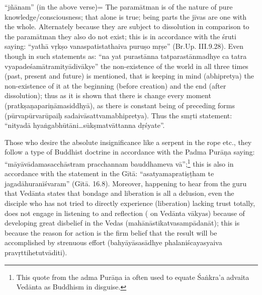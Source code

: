 “jñānam” (in the above verse)= The paramātman is of the nature of pure knowledge/consciousness; that alone is true; being parts the jīvas are one with the whole. Alternately because they are subject to dissolution in comparison to the paramātman they also do not exist; this is in accordance with the śruti saying: “yathā vṛkṣo vanaspatistathaiva puruṣo mṛṣe” (Br.Up. III.9.28). Even though in such statements as: “na yat purastānna tatparastānmadhye ca tatra vyapadeśamātramityādivākye” the non-existence of the world in all three times (past, present and future) is mentioned, that is keeping in mind (abhipretya) the non-existence of it at the beginning (before creation) and the end (after dissolution); thus as it is shown that there is change every moment (pratkṣaṇapariṇāmasiddhyā),  as there is constant being of  preceding forms (pūrvapūrvarūpaiḥ sadaivāsattvamabhipretya). Thus the smṛti statement: “nityadā hyaṅgabhūtāni…sūkṣmatvāttanna dṛśyate”.

Those who desire the absolute insignificance like a serpent in the rope etc., they follow a type of Buddhist doctrine in accordance with the Padma Purāṇa saying: “māyāvādamasacchāstram pracchannam bauddhameva vā”;\footnote{This quote from the adma Purāṇa ia often used to equate Śaṅkra’a advaita Vedānta as Buddhism in disguise.} this is also in accordance with the statement in the Gītā: “asatyamapratiṣṭham te jagadāhuranīśvaram” (Gītā. 16.8). Moreover, happening to hear from the guru that Vedānta states that bondage and liberation is all a delusion, even the disciple who has not tried to directly experience (liberation) lacking trust totally, does not  engage in listening to and reflection ( on Vedānta vākyas) because of developing great disbelief in the Vedas (mahānāstikatvasampādanāt); this is because the reason for action is the firm belief that the result will be accomplished by strenuous effort (bahyāyāsasādhye phalaniścayasyaiva pravṛttihetutvāditi).

